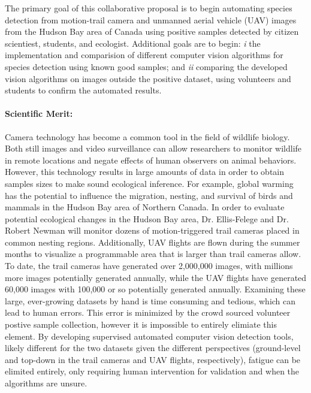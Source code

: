\documentclass[11pt]{article}
\begin{document}
\noindent
The primary goal of this collaborative proposal is to begin automating species detection from motion-trail camera and unmanned aerial vehicle (UAV) images from the Hudson Bay area of Canada using positive samples detected by citizen scientiest, students, and ecologist. Additional goals are to begin: {\it i} the implementation and comparision of different computer vision algorithms for species detection using known good samples; and {\it ii} comparing the developed vision algorithms on images outside the positive dataset, using volunteers and students to confirm the automated results.

\paragraph{Scientific Merit:} \hspace{-5mm} Camera technology has become a common tool in the field of wildlife biology.  Both still images and video surveillance can allow researchers to monitor wildlife in remote locations and negate effects of human observers on animal behaviors.  However, this technology results in large amounts of data in order to obtain samples sizes to make sound ecological inference.  For example, global warming has the potential to influence the
migration, nesting, and survival of birds and mammals in the Hudson Bay area of Northern Canada.  In order to evaluate potential ecological changes in the Hudson Bay area, Dr. Ellis-Felege and Dr. Robert Newman will monitor dozens of motion-triggered trail cameras placed in common nesting regions.  Additionally, UAV flights are flown during the summer months to visualize
a programmable area that is larger than trail cameras allow.  To date, the trail cameras have generated over 2,000,000 images, with millions more images potentially generated annually, while the UAV flights have generated 60,000 images with 100,000 or so potentially generated annually. Examining these large, ever-growing datasets by hand is time consuming and tedious, which can lead to human errors. This error is minimized by the crowd sourced volunteer postive sample collection,
however it is impossible to entirely elimiate this element. By developing supervised automated computer vision detection tools, likely different for the two datasets given the different perspectives (ground-level and top-down in the trail cameras and UAV flights, respectively), fatigue can be elimited entirely, only requiring human intervention for validation and when the algorithms are unsure.
\end{document}
